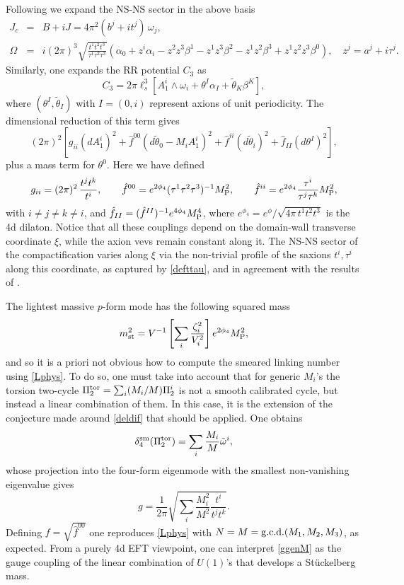 \documentclass[11pt]{article}
\def\a {\alpha}
\def\b {\beta}
\def\be{\begin{equation}}
\def\ee{\end{equation}}
\def\bea{\begin{eqnarray}}
\def\eea{\end{eqnarray}}
\def\om{\omega}
\def\Om{\Omega}
\begin{document}
Following \cite{Grana:2005ny,Kashani-Poor:2006ofe} we expand the NS-NS sector in the above basis
\bea
\label{JcandOm}
J_c  &= &B+ iJ = 4\pi^2 (b^j + i t^j) \, \om_j , \\ \nonumber
\Om  &=  & {i} (2\pi)^3 \sqrt{\frac{t^1t^2t^3}{\tau^1\tau^2\tau^3}} \left( \a_0 + z^i \a_i - z^2 z^3 \b^1 - z^1 z^3 \b^2 - z^1 z^2 \b^3  + z^1z^2z^3 \b^0 \right), \quad  z^j = a^j + i \tau^j .
\eea
Similarly, one expands the RR potential $C_3$ as
\be
 C_3 = 2\pi \ell_s^{3} \left[ A_1^i \wedge \om_i +  \theta^I \alpha_I + \tilde{\theta}_K \beta^K \right] ,
\ee
where $(\theta^I, \tilde{\theta}_I)$ with $I= (0,i)$ represent axions of unit periodicity. The dimensional reduction of this term gives 
\be
(2\pi)^2 \left[g_{ii} (dA_1^i)^2 + \hat{f}^{00} \left(d\tilde{\theta}_0 - M_i A_1^i\right)^2  + \hat{f}^{ii} (d\tilde{\theta}_i)^2 + \hat{f}_{II} (d{\theta}^I)^2  \right] ,
\label{StuckN=2gen}
\ee
plus a mass term for $\theta^0$. Here we have defined
\be
g_{ii} = (2\pi)^2\, \frac{t^j t^k}{t^i} , \qquad \hat{f}^{00} = e^{2\phi_4} (\tau^1\tau^2\tau^3)^{-1} M_{\rm P}^2 , \qquad \hat{f}^{ii} = e^{2\phi_4} \frac{\tau^i}{\tau^j\tau^k}  M_{\rm P}^2 ,
\ee
with $i \neq j \neq k \neq i$, and $\hat{f}_{II} = (\hat{f}^{II})^{-1} e^{4\phi_4}M_{\rm P}^4$, where $e^{\phi_4} = e^{\phi}/\sqrt{4\pi\,t^1t^2t^3}$ is the 4d dilaton. Notice that all these couplings depend on the domain-wall transverse coordinate $\xi$, while the axion vevs remain constant along it. The NS-NS sector of the compactification varies along $\xi$ via the non-trivial profile of the saxions $t^i, \tau^i$ along this coordinate, as captured by \eqref{defttau}, and in agreement with the results of \cite{Behrndt:2001mx,Mayer:2004sd}.

The lightest massive $p$-form mode has the following squared mass
\be
m_{\rm st}^2 = V^{-1} \left[\sum_i \frac{\zeta_i^2}{V_i^2} \right] e^{2\phi_4} M_{\rm P}^2 ,
\label{lamstexgen}
\ee
and so it is a priori not obvious how to compute the smeared linking number using \eqref{Lphys}. To do so, one must take into account that for generic $M_i$'s the torsion two-cycle $\Pi_2^{\rm tor} = \sum_i (M_i/M) \Pi_2^i$ is not a smooth calibrated cycle, but instead a linear combination of them. In this case, it is the extension of the conjecture made around \eqref{deldif} that should be applied. One obtains 
\be
\delta^{\rm sm}_4 (\Pi_2^{\rm tor}) =  \sum_i \frac{M_i}{M} \tilde{\om}^i ,
\ee
whose projection into the four-form eigenmode with the smallest non-vanishing eigenvalue gives
\be
g =   \frac{1}{2\pi}  \sqrt{ \sum_i \frac{M_i^{2}}{M^2} \frac{t^i} {t^j t^k }} .
\label{ggenM}
\ee
Defining $f = \sqrt{\hat{f}^{00}}$ one reproduces \eqref{Lphys} with $N=M = {\rm g.c.d.} (M_1, M_2, M_3)$, as expected. From a purely 4d EFT viewpoint, one can interpret \eqref{ggenM} as the gauge coupling of the linear combination of $U(1)$'s that develops a St\"uckelberg mass.
\end{document}
